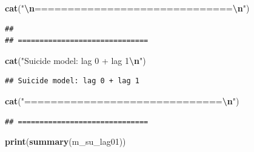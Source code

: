 \documentclass[
]{article}
\newenvironment{Shaded}{\begin{snugshade}}{\end{snugshade}}
\newcommand{\FunctionTok}[1]{\textcolor[rgb]{0.13,0.29,0.53}{\textbf{#1}}}
\newcommand{\NormalTok}[1]{#1}
\newcommand{\SpecialCharTok}[1]{\textcolor[rgb]{0.81,0.36,0.00}{\textbf{#1}}}
\newcommand{\StringTok}[1]{\textcolor[rgb]{0.31,0.60,0.02}{#1}}
\begin{document}
\begin{Shaded}
\begin{Highlighting}[]
\FunctionTok{cat}\NormalTok{(}\StringTok{"}\SpecialCharTok{\textbackslash{}n}\StringTok{==============================}\SpecialCharTok{\textbackslash{}n}\StringTok{"}\NormalTok{)}
\end{Highlighting}
\end{Shaded}

\begin{verbatim}
## 
## ==============================
\end{verbatim}

\begin{Shaded}
\begin{Highlighting}[]
\FunctionTok{cat}\NormalTok{(}\StringTok{"Suicide model: lag 0 + lag 1}\SpecialCharTok{\textbackslash{}n}\StringTok{"}\NormalTok{)}
\end{Highlighting}
\end{Shaded}

\begin{verbatim}
## Suicide model: lag 0 + lag 1
\end{verbatim}

\begin{Shaded}
\begin{Highlighting}[]
\FunctionTok{cat}\NormalTok{(}\StringTok{"==============================}\SpecialCharTok{\textbackslash{}n}\StringTok{"}\NormalTok{)}
\end{Highlighting}
\end{Shaded}

\begin{verbatim}
## ==============================
\end{verbatim}

\begin{Shaded}
\begin{Highlighting}[]
\FunctionTok{print}\NormalTok{(}\FunctionTok{summary}\NormalTok{(m\_su\_lag01))}
\end{Highlighting}
\end{Shaded}
\end{document}
